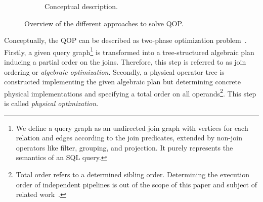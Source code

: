 \begin{figure}[!th]
\begin{subfigure}[b]{\columnwidth}
       \caption{Conceptual description.}
       \label{fig:overview-approaches}
    \end{subfigure}
    \vspace*{-18pt}
    \caption{Overview of the different approaches to solve QOP.}
    \label{fig:overview}
    \vspace*{-8pt}
\end{figure}

Conceptually, the QOP can be described as two-phase optimization problem~\cite{book_moerkotte}.  Firstly, a given query graph\footnote{We define a query graph as an undirected join graph with vertices for each relation and edges according to the join predicates, extended by non-join operators like filter, grouping, and projection.  It purely represents the semantics of an SQL query.} is transformed into a tree-structured algebraic plan inducing a partial order on the joins.  Therefore, this step is referred to as join ordering or \emph{algebraic optimization}.  Secondly, a physical operator tree is constructed implementing the given algebraic plan but determining concrete physical implementations and specifying a total order on all operands\footnote{Total order refers to a determined sibling order.  Determining the execution order of independent pipelines is out of the scope of this paper and subject of related work~\cite{pipeline_execution_order}.}.  This step is called \emph{physical optimization}.

